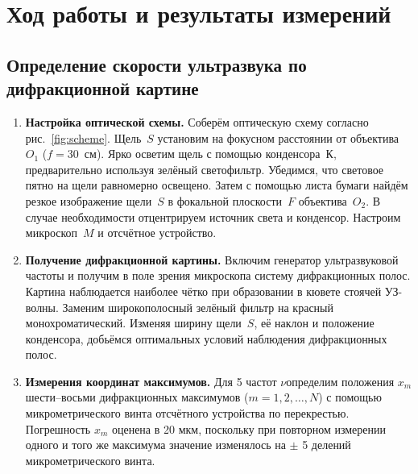 \documentclass[a4paper]{article}
\begin{document}
\section{Ход работы и результаты измерений}

\subsection{Определение скорости ультразвука по дифракционной картине}

\begin{enumerate}

\item \textbf{Настройка оптической схемы.} Соберём оптическую схему согласно рис.~\ref{fig:scheme}. Щель~$S$ установим на фокусном расстоянии от объектива~$O_1$ ($f = 30$~см). Ярко осветим щель с помощью конденсора~$К$, предварительно используя зелёный светофильтр. Убедимся, что световое пятно на щели равномерно освещено. Затем с помощью листа бумаги найдём резкое изображение щели~$S$ в фокальной плоскости~$F$ объектива~$O_2$. В случае необходимости отцентрируем источник света и конденсор. Настроим микроскоп~$M$ и отсчётное устройство.

\item \textbf{Получение дифракционной картины.} Включим генератор ультразвуковой частоты и получим в поле зрения микроскопа систему дифракционных полос. Картина наблюдается наиболее чётко при образовании в кювете стоячей УЗ-волны. Заменим широкополосный зелёный фильтр на красный монохроматический. Изменяя ширину щели~$S$, её наклон и положение конденсора, добьёмся оптимальных условий наблюдения дифракционных полос.

\item \textbf{Измерения координат максимумов.} Для 5 частот $\nu$определим положения $x_m$ шести--восьми дифракционных максимумов ($m = 1, 2, \ldots, N$) с помощью микрометрического винта отсчётного устройства по перекрестью. Погрешность $x_m$ оценена в 20 мкм, поскольку при повторном измерении одного и того же максимума значение изменялось на $\pm$ 5 делений микрометрического винта.


\end{enumerate}
\end{document}
